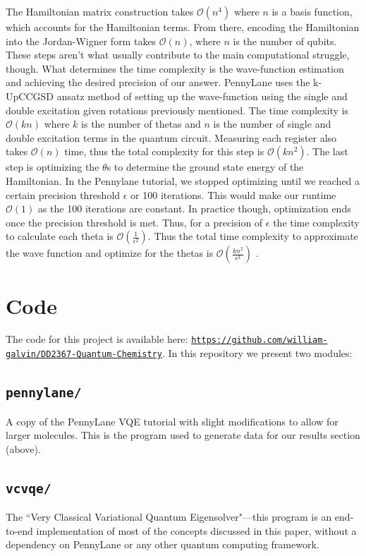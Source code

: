 \documentclass[11pt]{article}
\begin{document}
The Hamiltonian matrix construction takes $\mathcal{O}(n^4)$ where $n$ is a basis function, which accounts for the Hamiltonian terms. From there, encoding the Hamiltonian into the Jordan-Wigner form takes $\mathcal{O}(n)$, where $n$ is the number of qubits. These steps aren't what usually contribute to the main computational struggle, though. What determines the time complexity is the wave-function estimation and achieving the desired precision of our answer. PennyLane uses the k-UpCCGSD ansatz method of setting up the wave-function using the single and double excitation given rotations previously mentioned. The time complexity is $\mathcal{O}(kn)$ where $k$ is the number of thetas and $n$ is the number of single and double excitation terms in the quantum circuit. Measuring each register also takes $\mathcal{O}(n)$ time, thus the total complexity for this step is $\mathcal{O}(kn^2)$. The last step is optimizing the $\theta$s to determine the ground state energy of the Hamiltonian. In the Pennylane tutorial, we stopped optimizing until we reached a certain precision threshold $\epsilon$ or 100 iterations. This would make our runtime $\mathcal{O}(1)$ as the 100 iterations are constant. In practice though, optimization ends once the precision threshold is met. Thus, for a precision of $\epsilon$ the time complexity to calculate each theta is $\mathcal{O}(\frac{1}{\epsilon^2})$. Thus the total time complexity to approximate the wave function and optimize for the thetas is $\mathcal{O}(\frac{kn^2}{\epsilon^2})$ \cite{complex}.

\section{Code}
The code for this project is available here: \texttt{\href{https://github.com/william-galvin/DD2367-Quantum-Chemistry}{https://github.com/william-galvin/DD2367-Quantum-Chemistry}}. In this repository we present two modules:
    \subsection{\texttt{pennylane/}} A copy of the PennyLane VQE tutorial \cite{Delgado-VQE} with slight modifications to allow for larger molecules. This is the program used to generate data for our results section (above).
    \subsection{\texttt{vcvqe/}} The ``Very Classical Variational Quantum Eigensolver"---this program is an end-to-end implementation of most of the concepts discussed in this paper, without a dependency on PennyLane or any other quantum computing framework. 
\end{document}
